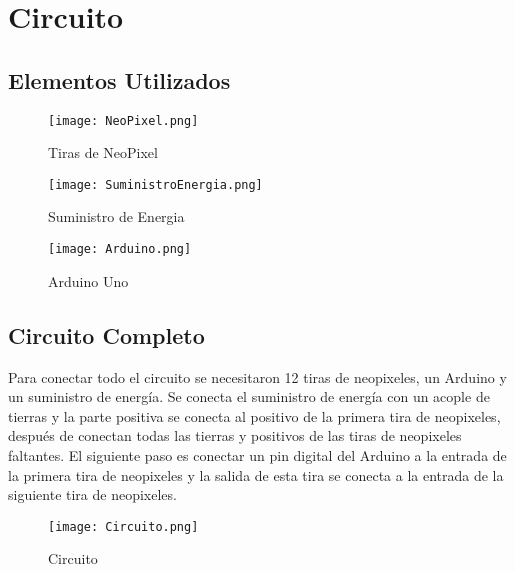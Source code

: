 \documentclass{article}
\begin{document}
\section{Circuito}\label{intro}
\subsection{Elementos Utilizados}
    \begin{figure}[h]
    \texttt{[image: NeoPixel.png]}
    \centering
    \caption{Tiras de NeoPixel}
    \label{fig:image}
    \vspace{1.5cm}
    \end{figure}

    \begin{figure}[h]
    \texttt{[image: SuministroEnergia.png]}
    \centering
    \caption{Suministro de Energia}
    \label{fig:image}
    \vspace{1.5cm}
    \end{figure}
    
    \begin{figure}[h]
    \texttt{[image: Arduino.png]}
    \centering
    \caption{Arduino Uno}
    \label{fig:image}
    \vspace{1.5cm}
    \end{figure}
\newpage
\subsection{Circuito Completo}
Para conectar todo el circuito se necesitaron 12 tiras de neopixeles, un Arduino y un suministro de energía. Se conecta el suministro de energía con un acople de tierras y la parte positiva se conecta al positivo de la primera tira de neopixeles, después de conectan todas las tierras y positivos de las tiras de neopixeles faltantes. El siguiente paso es conectar un pin digital del Arduino a la entrada de la primera tira de neopixeles y la salida de esta tira se conecta a la entrada de la siguiente tira de neopixeles.

    \begin{figure}[h]
    \texttt{[image: Circuito.png]}
    \centering
    \caption{Circuito}
    \label{fig:image}
    \vspace{1.5cm}
    \end{figure}
\end{document}
